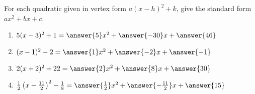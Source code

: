 \documentclass{ximera}
\author{Kenneth Berglund}
\begin{document}
\begin{exercise}
For each quadratic given in vertex form $a(x - h)^2 + k$, give the standard form $ax^2 + bx + c$.
\begin{enumerate}
\item $5(x - 3)^2 + 1 = \answer{5}x^2 + \answer{-30}x + \answer{46}$
\item $(x - 1)^2 - 2 = \answer{1}x^2 + \answer{-2}x + \answer{-1}$
\item $2(x + 2)^2 + 22 = \answer{2}x^2 + \answer{8}x + \answer{30}$
\item $\frac{1}{2}\left(x - \frac{11}{2}\right)^2 - \frac{1}{8} = \answer{\frac{1}{2}}x^2 + \answer{-\frac{11}{2}}x + \answer{15}$
\end{enumerate}
\end{exercise}
\end{document}
